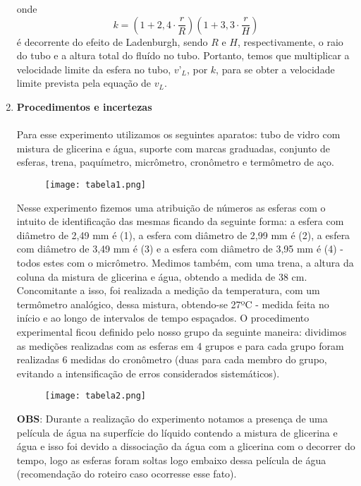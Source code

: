 \documentclass[a4paper, 11pt]{article}
\begin{document}
\begin{enumerate}
onde 
$$k = (1 + 2,4 \cdot \dfrac{r}{R})(1 + 3,3 \cdot \dfrac{r}{H})$$
é decorrente do efeito de Ladenburgh, sendo $R$ e $H$, respectivamente, o raio do tubo e a altura total do fluído no tubo. Portanto, temos que multiplicar a velocidade limite da esfera no tubo, $v’_L$, por $k$, para se obter a velocidade limite prevista pela equação de $v_L$.
\pagebreak
	
	\item \textbf{Procedimentos e incertezas}
\paragraph{}
Para esse experimento utilizamos os seguintes aparatos: tubo de vidro com mistura de glicerina e água, suporte com marcas graduadas, conjunto de esferas, trena, paquímetro, micrômetro, cronômetro e termômetro de aço.

\begin{figure}[!h]
		\centering
		\texttt{[image: tabela1.png]}
		\end{figure}

Nesse experimento fizemos uma atribuição de números as esferas com o intuito de identificação das mesmas ficando da seguinte forma: a esfera com diâmetro de 2,49 mm é (1), a esfera com diâmetro de 2,99 mm é (2), a esfera com diâmetro de 3,49 mm é (3) e a esfera com diâmetro de 3,95 mm é (4) - todos estes com o micrômetro. Medimos também, com uma trena, a altura da coluna da mistura de glicerina e água, obtendo a medida de 38 cm. Concomitante a isso, foi realizada a medição da temperatura, com um termômetro analógico, dessa mistura, obtendo-se 27ºC - medida feita no início e ao longo de intervalos de tempo espaçados. O procedimento experimental ficou definido pelo nosso grupo da seguinte maneira: dividimos as medições realizadas com as esferas em 4 grupos e para cada grupo foram realizadas 6 medidas do cronômetro (duas para cada membro do grupo, evitando a intensificação de erros considerados sistemáticos).
\\

\begin{figure}[!h]
		\centering
		\texttt{[image: tabela2.png]}
		\end{figure}

\textbf{OBS}: Durante a realização do experimento notamos a presença de uma película de água na superfície do líquido contendo a mistura de glicerina e água e isso foi devido a dissociação da água com a glicerina com o decorrer do tempo, logo as esferas foram soltas logo embaixo dessa película de água (recomendação do roteiro caso ocorresse esse fato).
\\


\end{enumerate}
\end{document}
